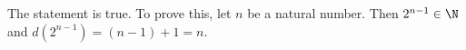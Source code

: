 \begin{list}{\bf{\ref{exer:numberofdivisors}.}}
\begin{enumerate}
\end{enumerate}
\end{list}
%
\begin{list}{}
\item \begin{list}{\bf{(g)}}
\item The statement is true.  To prove this, let $n$ be a natural number.  Then $2^{n-1} \in \N$ and 
$d \left( 2^{n-1} \right) = (n - 1) + 1 = n$.
\end{list}
\end{list}


